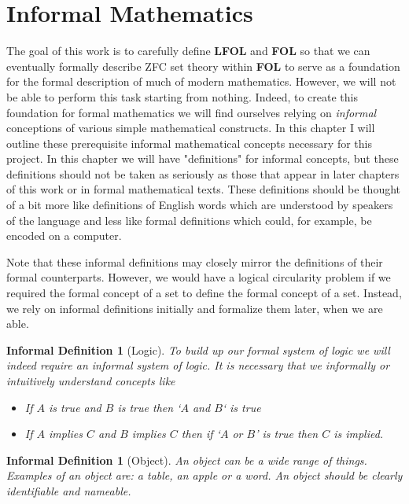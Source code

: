 \documentclass[12pt]{article}
\theoremstyle{break}
\theoremstyle{break}
\theoremstyle{break}
\theoremstyle{break}
\theoremstyle{break}
\newtheorem{informal definition}[definition]{Informal Definition}
\begin{document}
\newpage
\section{Informal Mathematics}
The goal of this work is to carefully define \textbf{LFOL} and \textbf{FOL} so that we can eventually formally describe ZFC set theory within \textbf{FOL} to serve as a foundation for the formal description of much of modern mathematics.
However, we will not be able to perform this task starting from nothing.
Indeed, to create this foundation for formal mathematics we will find ourselves relying on \textit{informal} conceptions of various simple mathematical constructs.
In this chapter I will outline these prerequisite informal mathematical concepts necessary for this project.
In this chapter we will have "definitions" for informal concepts, but these definitions should not be taken as seriously as those that appear in later chapters of this work or in formal mathematical texts.
These definitions should be thought of a bit more like definitions of English words which are understood by speakers of the language and less like formal definitions which could, for example, be encoded on a computer.

Note that these informal definitions may closely mirror the definitions of their formal counterparts.
However, we would have a logical circularity problem if we required the formal concept of a set to define the formal concept of a set.
Instead, we rely on informal definitions initially and formalize them later, when we are able.

\begin{informal definition}[Logic]
To build up our formal system of logic we will indeed require an informal system of logic.
It is necessary that we informally or intuitively understand concepts like
\begin{itemize}
\item{If $A$ is true and $B$ is true then `$A$ and $B$` is true}
\item{If $A$ implies $C$ and $B$ implies $C$ then if `$A$ or $B$' is true then $C$ is implied.}
\end{itemize}
\end{informal definition}

\begin{informal definition}[Object]
An object can be a wide range of things.
Examples of an object are: a table, an apple or a word.
An object should be clearly identifiable and nameable.
\end{informal definition}
\end{document}
